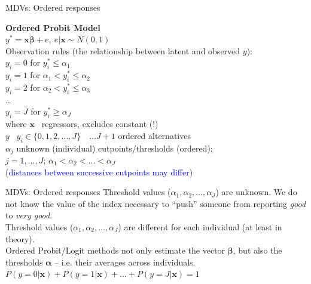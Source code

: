 \documentclass[usenames,dvipsnames]{beamer}
\begin{document}
\begin{frame}{MDVs: Ordered responses}

{\small
\textbf{Ordered Probit Model} \\
\bigskip
\quad $y^{\ast} = \bm{x \beta} + e, \ e|\bm{x} \sim \textit{N}(0,1)$ \\
\bigskip
Observation rules (the relationship between latent and observed $y$): \\
\medskip
\qquad $y_i = 0$ for \hspace*{10mm} $y_i^{\ast} \le \alpha_1$ \\
\medskip
\qquad $y_i = 1$ for \quad  $\alpha_1 < y_i^{\ast} \le \alpha_2$ \\
\medskip
\qquad $y_i = 2$ for \quad  $\alpha_2 < y_i^{\ast} \le \alpha_3$ \\
\qquad \dots \\

\qquad $y_i = J$ for \hspace*{10mm} $y_i^{\ast} \ge \alpha_J$ \\
\bigskip
where $\bm{x}$ \quad \ regressors, excludes constant (!) \\
\smallskip
\hspace*{9mm} $y$ \quad \ $y_i \in \{0,1,2, \dots, J \} \quad \dots J+1 $ ordered alternatives \\
\smallskip
\hspace*{9mm} $\alpha_j$  \quad unknown (individual) cutpoints/thresholds (ordered);\\ 
\hspace*{17mm} $j = 1, \dots, J$; $\alpha_1 < \alpha_2 < \dots < \alpha_J$ \\
\smallskip
\hspace*{17mm} (\textcolor{Blue}{distances between successive cutpoints may differ})}
\end{frame}
\begin{frame}{MDVs: Ordered responses}
Threshold values ($\alpha_1, \alpha_2, \dots, \alpha_J$) are unknown.  We do not know the value of the index necessary to ``push'' someone from reporting \textit{good} to \textit{very good}. \\
\vspace*{6mm}
Threshold values ($\alpha_1, \alpha_2, \dots, \alpha_J$) are different for each individual (at least in theory).\\
\vspace*{6mm}
Ordered Probit/Logit methods not only estimate the vector $\bm{\beta}$, but also the thresholds $\bm{\alpha}$ – i.e. their averages across individuals. \\
\vspace*{6mm}
$P(y=0|\bm{x}) + P(y=1|\bm{x}) + \dots + P(y=J|\bm{x}) = 1$
\end{frame}
\end{document}
